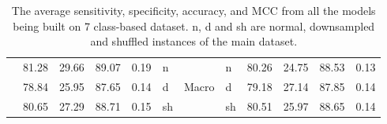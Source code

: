 \begin{table}[ht]
\begin{tabular}{|L |V V V V g g g V V V V |}

        & 81.28 & 29.66 & 89.07 & 0.19 &    n&&n                & 80.26 & 24.75 & 88.53 & 0.13 \\
        & 78.84 & 25.95 & 87.65 & 0.14&     d&\small{Macro}&d   & 79.18 & 27.14 & 87.85 & 0.14\\
        & 80.65 & 27.29 & 88.71 & 0.15 &    sh&&sh              & 80.51 & 25.97 & 88.65 & 0.14 \\
        \hline
        
       

    \end{tabular}
    \captionsetup{font=small,width=12cm}
    \caption{The average sensitivity, specificity, accuracy, and MCC from all the 
    models being built on 7 class-based dataset. n, d and sh are normal, 
    downsampled and shuffled instances of the main dataset.}
    \label{tab:table4}
    
\end{table}